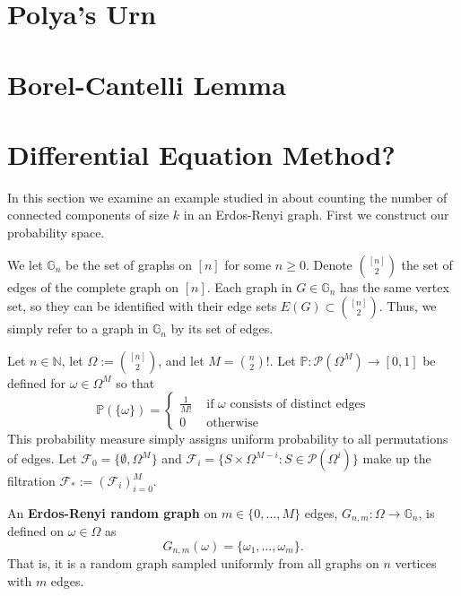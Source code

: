 \section{Polya's Urn}
\label{stoch:polya}

\section{Borel-Cantelli Lemma}

\section{Differential Equation Method?}

In this section we examine an example studied in \cite{diffeq_2020} about counting the number of connected components of size \(k\) in an Erdos-Renyi graph. First we  construct our probability space. 

We let \(\mathbb{G}_{n}\) be the set of graphs on \([n]\) for some \(n \geq 0\). Denote \(\binom{[n]}{2}\) the set of edges of the complete graph on \([n]\). Each graph in \(G \in \mathbb{G}_{n}\) has the same vertex set, so they can be identified with their edge sets \(E(G) \subset \binom{[n]}{2}\). Thus, we simply refer to a graph in \(\mathbb{G}_{n}\) by its set of edges. 

Let \(n \in \mathbb{N}\), let \(\Omega :=  \binom{[n]}{2}\), and let \(M = \binom{n}{2}!\). Let \(\mathbb{P}: \mathcal{P}(\Omega^{M}) \to [0,1]\) be defined for \(\omega \in \Omega^{M}\) so that
\[\mathbb{P}(\{\omega\}) = \begin{cases} \frac{1}{M!} & \text{ if } \omega \text{ consists of distinct edges} \\ 0 & \text{ otherwise}\end{cases}\]
This probability measure simply assigns uniform probability to all permutations of edges. Let \(\mathcal{F}_{0}= \{\emptyset, \Omega^{M}\}\) and \(\mathcal{F}_{i} = \{S \times \Omega^{M-i} : S \in \mathcal{P}(\Omega^{i})\}\) make up the filtration \(\mathcal{F}_{*} := (\mathcal{F}_{i})_{i=0}^{M}\).

\begin{definition}
    An \textbf{Erdos-Renyi random graph} on \(m \in \{0, \dots, M\}\) edges, \(G_{n, m}: \Omega \to \mathbb{G}_{n}\), is defined on \(\omega \in \Omega\) as
    \[G_{n, m}(\omega) = \{\omega_{1}, \dots, \omega_{m}\}.\]
    That is, it is a random graph sampled uniformly from all graphs on \(n\) vertices with \(m\) edges. 
\end{definition}


